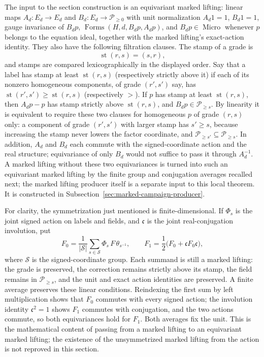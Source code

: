 The input to the section construction is an equivariant marked lifting: linear maps
$A_d:E_d\to E_d$ and $B_d:E_d\to\mathcal P_{\geq0}$ with unit normalization
$A_d1=1$, $B_d1=1$, gauge invariance of $B_dp$,
$\operatorname{Forms}(H,d,B_dp,A_dp)$, and $B_dp\in\operatorname{Micro}$
whenever $p$ belongs to the equation ideal, together with the marked lifting's
exact-action identity. They also have
the following filtration clauses. The stamp of a grade is
\[
                         \operatorname{st}(r,s)=(s,r),
\]
and stamps are compared lexicographically in the displayed order. Say
that a label has stamp at least $\operatorname{st}(r,s)$ (respectively
strictly above it) if each of its nonzero homogeneous components, of
grade $(r',s')$ say, has
$\operatorname{st}(r',s')\geq\operatorname{st}(r,s)$ (respectively $>$).
If $p$ has stamp at least $\operatorname{st}(r,s)$, then $A_dp-p$ has
stamp strictly above $\operatorname{st}(r,s)$, and
$B_dp\in\mathcal P_{\geq s}$. By linearity it is equivalent to require
these two clauses for homogeneous $p$ of grade $(r,s)$ only: a component
of grade $(r',s')$ with larger stamp has $s'\geq s$, because increasing
the stamp never lowers the factor coordinate, and
$\mathcal P_{\geq s'}\subseteq\mathcal P_{\geq s}$. In addition, $A_d$ and
$B_d$ each commute with
the signed-coordinate action and the real structure; equivariance of only
$B_d$ would not suffice to pass it through $A_d^{-1}$. A marked lifting without
these two equivariances is turned into such an equivariant marked lifting by the finite group
and conjugation averages recalled next; the marked lifting producer itself is a
separate input to this local theorem. It is constructed in
Subsection~\ref{sec:marked-campaign-producer}.

For clarity, the symmetrization just mentioned is finite-dimensional. If
$\Phi_s$ is the joint signed action on labels and fields, and $\mathfrak c$
is the joint real-conjugation involution, put
\[
 F_0=\frac1{|\mathcal S|}\sum_{s\in\mathcal S}
       \Phi_s\,F\,\theta_{s^{-1}},\qquad
 F_1=\frac12\bigl(F_0+\mathfrak c F_0\mathfrak c\bigr),
\]
where $\mathcal S$ is the signed-coordinate group. Each summand is still a
marked lifting: the grade is preserved, the correction remains strictly above
its stamp, the field remains in $\mathcal P_{\geq s}$, and the unit
and exact action identities are preserved. A finite average preserves
these linear conditions. Reindexing the first sum by left multiplication
shows that $F_0$ commutes with every signed action; the involution identity
$\mathfrak c^2=1$ shows $F_1$ commutes with conjugation, and the two
actions commute, so both equivariances hold for $F_1$. Both averages fix
the unit. This is the mathematical content of passing from a marked lifting to
an equivariant marked lifting; the existence of the unsymmetrized marked lifting from the action is
not reproved in this section.

